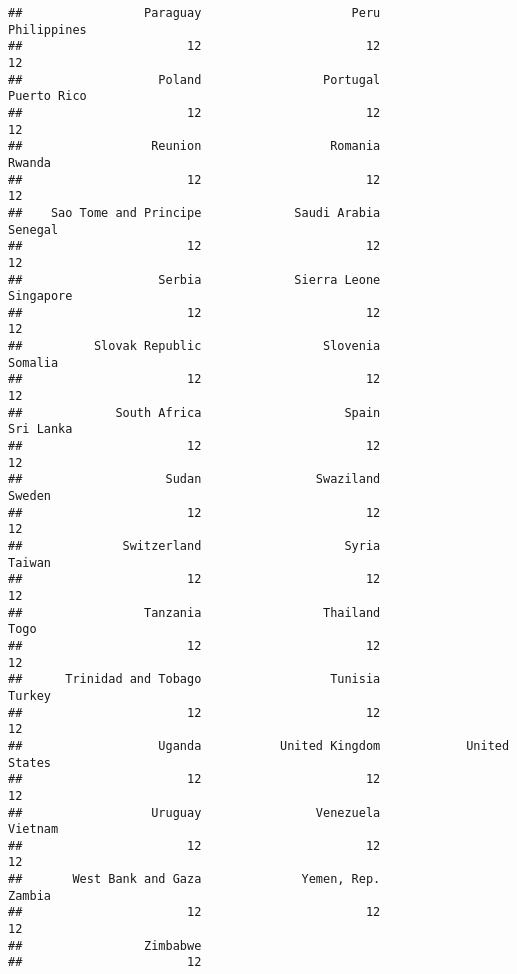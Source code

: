 \documentclass[
]{book}
\newenvironment{Shaded}{\begin{snugshade}}{\end{snugshade}}
\newcommand{\CommentTok}[1]{\textcolor[rgb]{0.56,0.35,0.01}{\textit{#1}}}
\newcommand{\FunctionTok}[1]{\textcolor[rgb]{0.00,0.00,0.00}{#1}}
\newcommand{\NormalTok}[1]{#1}
\newcommand{\SpecialCharTok}[1]{\textcolor[rgb]{0.00,0.00,0.00}{#1}}
\begin{document}
\begin{verbatim}
##                 Paraguay                     Peru              Philippines 
##                       12                       12                       12 
##                   Poland                 Portugal              Puerto Rico 
##                       12                       12                       12 
##                  Reunion                  Romania                   Rwanda 
##                       12                       12                       12 
##    Sao Tome and Principe             Saudi Arabia                  Senegal 
##                       12                       12                       12 
##                   Serbia             Sierra Leone                Singapore 
##                       12                       12                       12 
##          Slovak Republic                 Slovenia                  Somalia 
##                       12                       12                       12 
##             South Africa                    Spain                Sri Lanka 
##                       12                       12                       12 
##                    Sudan                Swaziland                   Sweden 
##                       12                       12                       12 
##              Switzerland                    Syria                   Taiwan 
##                       12                       12                       12 
##                 Tanzania                 Thailand                     Togo 
##                       12                       12                       12 
##      Trinidad and Tobago                  Tunisia                   Turkey 
##                       12                       12                       12 
##                   Uganda           United Kingdom            United States 
##                       12                       12                       12 
##                  Uruguay                Venezuela                  Vietnam 
##                       12                       12                       12 
##       West Bank and Gaza              Yemen, Rep.                   Zambia 
##                       12                       12                       12 
##                 Zimbabwe 
##                       12
\end{verbatim}

\begin{Shaded}
\end{Shaded}
\end{document}
